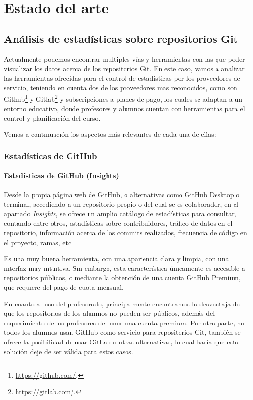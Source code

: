 \chapter{Estado del arte\label{02estadoArte}}

\section{Análisis de estadísticas sobre repositorios Git}

Actualmente podemos encontrar multiples vías y herramientas con las que
poder visualizar los datos acerca de los repositorios Git. En este caso,
vamos a analizar las herramientas ofrecidas para el control de
estadísticas por los proveedores de servicio, teniendo en cuenta dos de
los proveedores mas reconocidos, como son
Github\footnote{\url{https://github.com/}.} y
Gitlab\footnote{\url{https://gitlab.com/}.} y subscripciones a planes de
pago, los cuales se adaptan a un entorno educativo, donde profesores y
alumnos cuentan con herramientas para el control y planificación del curso.

Vemos a continuación los aspectos más relevantes de cada una de ellas:

\subsection{Estadísticas de GitHub}

\subsubsection{Estadísticas de GitHub (Insights)}

Desde la propia página web de GitHub, o alternativas como GitHub Desktop o
terminal, accediendo a un repositorio propio o del cual se es colaborador,
en el apartado \emph{Insights}, se ofrece un amplio catálogo de
estadísticas para consultar, contando entre otros, estadísticas sobre
contribuidores, tráfico de datos en el repositorio, información acerca de
los commits realizados, frecuencia de código en el proyecto, ramas, etc.

Es una muy buena herramienta, con una apariencia clara y limpia, con una
interfaz muy intuitiva. Sin embargo, esta característica únicamente es
accesible a repositorios públicos, o mediante la obtención de una cuenta
GitHub Premium, que requiere del pago de cuota mensual.

En cuanto al uso del profesorado, principalmente encontramos la desventaja
de que los repositorios de los alumnos no pueden ser públicos, además del
requerimiento de los profesores de tener una cuenta premium. Por otra
parte, no todos los alumnos usan GitHub como servicio para repositorios
Git, también se ofrece la posibilidad de usar GitLab o otras alternativas,
lo cual haría que esta solución deje de ser válida para estos casos.


